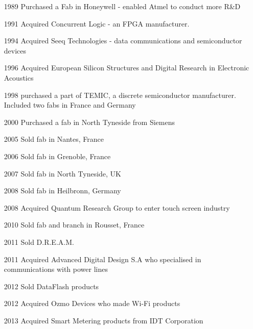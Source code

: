 \begin{enumerate}
\item[1989] Purchased a Fab in Honeywell - enabled Atmel to conduct more R\&D %
\item[1991] Acquired Concurrent Logic - an FPGA manufacturer. %
\item[1994] Acquired Seeq Technologies - data communications and semiconductor devices%
\item[1996] Acquired European Silicon Structures and Digital Research in Electronic Acoustics%
\item[1998] purchased a part of TEMIC, a discrete semiconductor manufacturer. Included two fabs in France and Germany %
\item[2000] Purchased a fab in North Tyneside from Siemens %
\item[2005] Sold fab in Nantes, France \cite{atmel:acq:nantes05}
\item[2006] Sold fab in Grenoble, France \cite{atmel:acq:grenoble06}
\item[2007] Sold fab in North Tyneside, UK\cite{atmel:acq:tyneside07}
\item[2008] Sold fab in Heilbronn, Germany\cite{atmel:acq:heilbronn08}
\item[2008] Acquired Quantum Research Group to enter touch screen industry\cite{atmel:acq:qrg08}
\item[2010] Sold fab and branch in Rousset, France\cite{atmel:acq:sms10}
\item[2011] Sold D.R.E.A.M. %
\item[2011] Acquired Advanced Digital Design S.A who specialised in communications with power lines \cite{atmel:acq:add11}
\item[2012] Sold DataFlash products \cite{atmel:acq:sflash12}
\item[2012] Acquired Ozmo Devices who made Wi-Fi products %
\item[2013] Acquired Smart Metering products from IDT Corporation \cite{atmel:acq:smartmeter13}
\end{enumerate}

